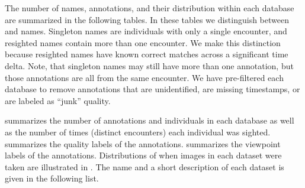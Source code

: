         \DatabaseInfo{}

        \timedist{}

        The number of names, annotations, and their distribution within each database are summarized in the
          following tables.
        In these tables we distinguish between  and  names.
        Singleton names are individuals with only a single encounter, and resighted names contain more than one
          encounter.
        We make this distinction because resighted names have known correct matches across a significant time
          delta.
        Note, that singleton names may still have more than one annotation, but those annotations are all from
          the same encounter.
        We have pre-filtered each database to remove annotations that are unidentified, are missing timestamps,
          or are labeled as ``junk'' quality.

         summarizes the number of annotations and individuals in each database as
          well as the number of times (distinct encounters) each individual was sighted.
         summarizes the quality labels of the annotations.
         summarizes the viewpoint labels of the annotations.
        Distributions of when images in each dataset were taken are illustrated in .
        The name and a short description of each dataset is given in the following list.

